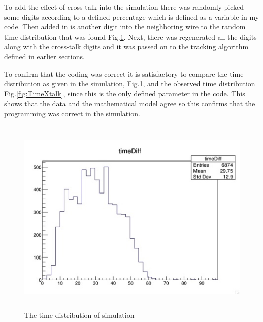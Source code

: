 \documentclass[./Thesis]{subfiles}
\begin{document}
	To add the effect of cross talk into the simulation there was randomly picked some digits according to a defined percentage which is defined as a variable in my code.  Then added in is another digit into the neighboring wire to the random time distribution that was found Fig.\ref{fig:TimeDiffSim}. Next, there was regenerated all the digits along with the cross-talk digits and it was passed on to the tracking algorithm defined in earlier sections.

  To confirm that the coding was correct it is satisfactory to compare the time distribution as given in the simulation, Fig.\ref{fig:TimeDiffSim}, and the observed time distribution Fig.\ref{fig:TimeXtalk}, since this is the only defined parameter in the code. This shows that the data and the mathematical model agree so this confirms that the programming was correct in the simulation.
	
\begin{figure}
	\centerline{\includegraphics[height=95mm]{TimeDistSim.jpeg}}
	\caption[ Time Distribution of Simulation]{ The time distribution of simulation}
	\label{fig:TimeDiffSim}
\end{figure}
	
\end{document}
